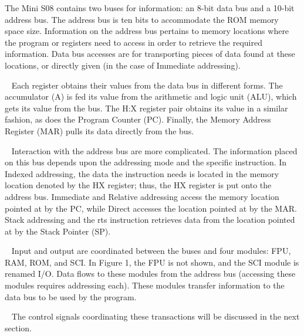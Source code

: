 \documentclass[letterpaper, 12pt]{article}
\begin{document}
\begin{flushleft}
The Mini S08 contains two buses for information: an 8-bit data bus and a 10-bit address bus.  The address bus is ten bits to accommodate the ROM memory space size.  Information on the address bus pertains to memory locations where the program or registers need to access in order to retrieve the required information.  Data bus accesses are for transporting pieces of data found at these locations, or directly given (in the case of Immediate addressing).

~\newline
Each register obtains their values from the data bus in different forms.  The accumulator (A) is fed its value from the arithmetic and logic unit (ALU), which gets its value from the bus.  The H:X register pair obtains its value in a similar fashion, as does the Program Counter (PC).  Finally, the Memory Address Register (MAR) pulls its data directly from the bus.

~\newpage
Interaction with the address bus are more complicated.  The information placed on this bus depends upon the addressing mode and the specific instruction.  In Indexed addressing, the data the instruction needs is located in the memory location denoted by the HX register; thus, the HX register is put onto the address bus.  Immediate and Relative addressing access the memory location pointed at by the PC, while Direct accesses the location pointed at by the MAR. Stack addressing and the rts instruction retrieves data from the location pointed at by the Stack Pointer (SP).

~\newline
Input and output are coordinated between the buses and four modules: FPU, RAM, ROM, and SCI.  In Figure 1, the FPU is not shown, and the SCI module is renamed I/O.  Data flows to these modules from the address bus (accessing these modules requires addressing each).  These modules transfer information to the data bus to be used by the program.

~\newline
The control signals coordinating these transactions will be discussed in the next section.

~\newline

\end{flushleft}
\end{document}
